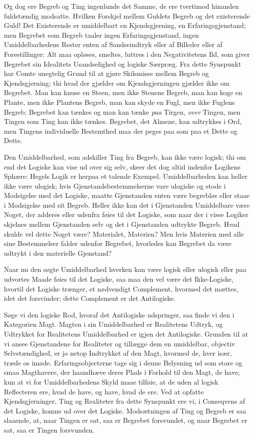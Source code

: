 \documentclass[12pt]{article}
\newcommand{\opage}[1]{\marginnote{\footnotesize\textit{[#1]}}}
\begin{document}
Og dog ere Begreb og Ting ingenlunde det Samme, de
ere tvertimod hinanden fuldstændig modsatte. Hvilken Forskjel
mellem Guldets Begreb og det existerende Guld! Det
Existerende er umiddelbart en Kjendsgjerning, en Erfaringsgjenstand;
men Begrebet som Begreb taaler ingen Erfaringsgjenstand, ingen
Umiddelbarhedens Rester enten af Sandseindtryk eller af
Billeder eller af Forestillinger: Alt maa opløses, smeltes, luttres
i den Negativitetens Ild, som giver Begrebet sin Idealitets
Usandselighed og logiske Særpræg. Fra dette Synspunkt har
Comte unegtelig Grund til at gjøre Skilsmisse mellem Begreb
og Kjendsgjerning; thi hvad der gjælder om Kjendsgjerningen
gjælder ikke om Begrebet. Man kan knuse en Steen, men ikke
Stenens Begreb, man kan koge en Plante, men ikke Plantens
Begreb, man kan skyde en Fugl, men ikke Fuglens Begreb;
Begrebet kan tænkes og man kan tænke \emph{paa} Tirgen, \emph{over}
Tingen, men Tingen som Ting kan ikke tænkes. Begrebet, det
Almene, kan udtrykkes i Ord, men Tingens individuelle
Bestemthed maa der peges paa som paa et Dette og Dette.

Den Umiddelbarhed, som adskiller Ting fra Begreb, kan
ikke være logisk; thi om end det Logiske kan vise ud over sig
selv, skeer det dog altid indenfor Logikens Sphære: Hegels
\opage{33} Logik er herpaa et talende Exempel. Umiddelbarheden kan
heller ikke være ulogisk; hvis Gjenstandsbestemmelserne vare
ulogiske og stode i Modsigelse med det Logiske, maatte
Gjenstanden enten være begrebløs eller staae i Modsigelse med sit
Begreb. Heller ikke kan det i Gjenstanden Umiddelbare være
Noget, der adderes eller udenfra føies til det Logiske, som naar
der i visse Logiker skjelnes mellem Gjenstanden selv og det
i Gjenstanden udtrykte Begreb. Hvad skulde vel dette Noget
være? Materialet, Materien? Men hvis Materien med alle sine
Bestemmelser falder udenfor Begrebet, hvorledes kan Begrebet
da være udtrykt i den materielle Gjenstand?

Naar nu den søgte Umiddelbarhed hverken kan være
logisk eller ulogisk eller paa udvortes Maade føies til det
Logiske, saa maa den vel være det Ikke-Logiske, hvortil det
Logiske trænger, et nødvendigt Complement, hvormed det
mættes, idet det forsvinder; dette Complement er det
Antilogiske.

Søge vi den logiske Rod, hvoraf det Antilogiske udspringer,
saa finde vi den i Kategorien Magt. Magten i sin
Umiddelbarhed er Realitetens Udtryk, og Udtrykket for Realitetens
Umiddelbarhed er igjen det Antilogiske. Grunden til at vi ansee
Gjenstandene for Realiteter og tillægge dem en umiddelbar,
objectiv Selvstændighed, er jo netop Indtrykket af den Magt,
hvormed de, hver især, træde os imøde. Erfaringsobjecterne
tage sig i denne Belysning ud som store og smaa Magthavere,
der haandhæve deres Plads i Forhold til den Magt, de have;
kun at vi for Umiddelbarhedens Skyld maae tilføie, at de uden
al logisk Reflecteren ere, hvad de have, og have, hvad de ere.
Ved at opfatte Kjendsgjerninger, Ting og Realiteter fra dette
Synspunkt ere vi, i Conseqvens af det Logiske, komne ud over
det Logiske. Modsætningen af Ting og Begreb er saa slaaende,
at, naar Tingen er sat, saa er Begrebet forsvundet, og naar
Begrebet er sat, saa er Tingen forsvunden.
\end{document}
